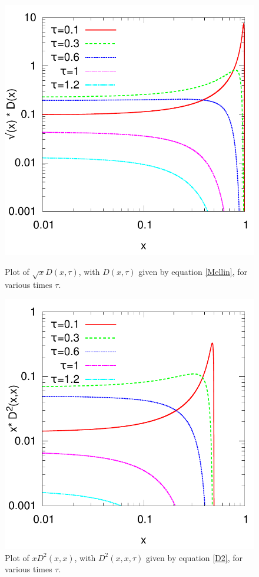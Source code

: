 \documentclass[a4paper,12pt]{article}
\numberwithin{equation}{section}
\begin{document}
\begin{figure}
  \includegraphics[width=\linewidth]{plotD.pdf}
  \vspace*{-20pt}
  \caption{Plot of $\sqrt{x}D(x,\tau)$, with $D(x,\tau)$ given by equation \eqref{Mellin}, for various times $\tau$.}\label{Dfig}
\endminipage\hfill
{}
  \includegraphics[width=\linewidth]{plotD2.pdf}
  \vspace*{-20pt}
  \caption{Plot of $x D^2(x,x)$, with $D^2(x,x,\tau)$ given by equation \eqref{D2}, for various times $\tau$.}\label{D2fig}
\endminipage\hfill
\end{figure}
\end{document}
